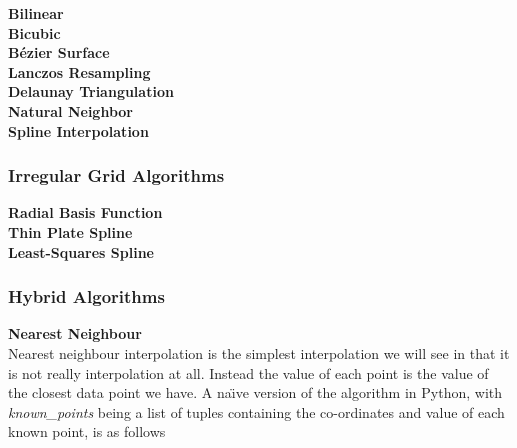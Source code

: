 			\textbf{Bilinear}\label{datavalidation_bilinear} \\
			
			\textbf{Bicubic}\label{datavalidation_bicubic} \\
			
			\textbf{B\'{e}zier Surface}\label{datavalidation_beziersurface} \\
			
			\textbf{Lanczos Resampling}\label{datavalidation_lanczosresampling} \\
			
			\textbf{Delaunay Triangulation}\label{datavalidation_delaunaytriangulation} \\
			
			\textbf{Natural Neighbor}\label{datavalidation_naturalneighbour} \\
			
			\textbf{Spline Interpolation}\label{datavalidation_splineinterpolation} \\

		\subsubsection{Irregular Grid Algorithms}\label{datavalidation_irregular_grid}

			\textbf{Radial Basis Function}\label{datavalidation_radial_basis_function} \\

			\textbf{Thin Plate Spline}\label{datavalidation_thin_plate_spline} \\

			\textbf{Least-Squares Spline}\label{datavalidation_least_squares_spline} \\

		\subsubsection{Hybrid Algorithms}\label{datavalidation_hybrid_algorithms}

			\textbf{Nearest Neighbour}\label{datavalidation_nearest_neighbour} \\

				Nearest neighbour interpolation is the simplest interpolation we will see in that it is not really interpolation at all. Instead the value of each point is the value of the closest data point we have. A na\"{\i}ve version of the algorithm in Python, with \emph{known\_points} being a list of tuples containing the co-ordinates and value of each known point, is as follows\:

